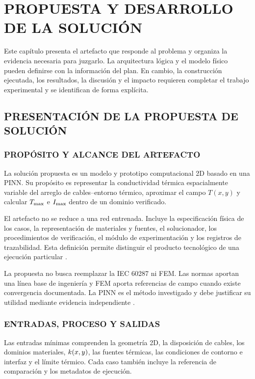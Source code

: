 \chapter{PROPUESTA Y DESARROLLO DE LA SOLUCIÓN}
\label{ch:propuesta-desarrollo}

Este capítulo presenta el artefacto que responde al problema y organiza la evidencia necesaria para juzgarlo. La arquitectura lógica y el modelo físico pueden definirse con la información del plan. En cambio, la construcción ejecutada, los resultados, la discusión y el impacto requieren completar el trabajo experimental y se identifican de forma explícita.

\section{PRESENTACIÓN DE LA PROPUESTA DE SOLUCIÓN}
\label{sec:presentacion-propuesta}

\subsection{PROPÓSITO Y ALCANCE DEL ARTEFACTO}

La solución propuesta es un modelo y prototipo computacional 2D basado en una PINN. Su propósito es representar la conductividad térmica espacialmente variable del arreglo de cables--entorno térmico, aproximar el campo $T(x,y)$ y calcular $T_{\max}$ e $I_{\max}$ dentro de un dominio verificado.

El artefacto no se reduce a una red entrenada. Incluye la especificación física de los casos, la representación de materiales y fuentes, el solucionador, los procedimientos de verificación, el módulo de experimentación y los registros de trazabilidad. Esta definición permite distinguir el producto tecnológico de una ejecución particular \parencite[342--350]{gregor2013}.

La propuesta no busca reemplazar la IEC 60287 ni FEM. Las normas aportan una línea base de ingeniería y FEM aporta referencias de campo cuando existe convergencia documentada. La PINN es el método investigado y debe justificar su utilidad mediante evidencia independiente \parencites{iec60287}[3--4,93--99]{cigre2025}.

\subsection{ENTRADAS, PROCESO Y SALIDAS}

Las entradas mínimas comprenden la geometría 2D, la disposición de cables, los dominios materiales, $k(x,y)$, las fuentes térmicas, las condiciones de contorno e interfaz y el límite térmico. Cada caso también incluye la referencia de comparación y los metadatos de ejecución.

